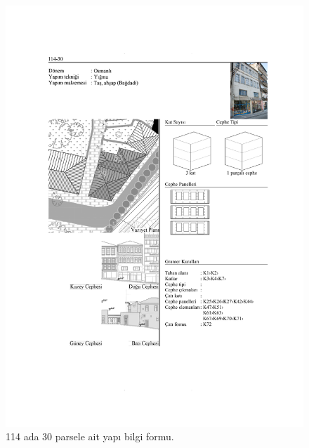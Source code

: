 \begin{figure}
\centering
\includegraphics[width=1\textwidth,height=\textheight]{source/figures/BilgiFormlari/114-30.pdf}
\caption{114 ada 30 parsele ait yapı bilgi formu.}
\end{figure}

